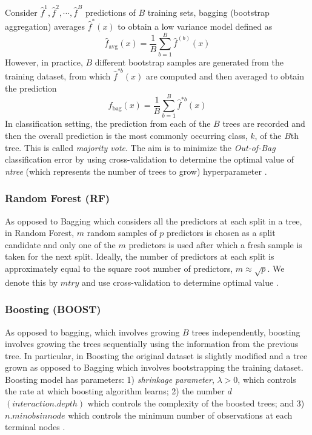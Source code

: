 Consider $\hat{f}^1, \hat{f}^2, \cdots, \hat{f}^B$ predictions of $B$ training sets, bagging (bootstrap aggregation) averages $\hat{f}^*(x)$ to obtain a low variance model defined as
\[
\hat{f}_{\text{avg}}(x) = \frac{1}{B}\sum^{B}_{b=1}{\hat{f}^{(b)}(x)}
\]
However, in practice, $B$ different bootstrap samples are generated from the training dataset, from which $\hat{f}^{*b}(x)$ are computed and then averaged to obtain the prediction 
\[
\hat{f}_{\text{bag}}(x) = \frac{1}{B}\sum^{B}_{b=1}{\hat{f}^{*b}(x)}
\]
In classification setting, the prediction from each of the $B$ trees are recorded and then the overall prediction is the most commonly occurring class, $k$, of the $B$th tree. This is called \textit{majority vote}. The aim is to minimize the \textit{Out-of-Bag} classification error by using cross-validation to determine  the optimal value of \textit{ntree} (which represents the number of trees to grow) hyperparameter \citep{james2013introduction}.

\subsubsection{Random Forest (RF)}

As opposed to Bagging which considers all the predictors at each split in a tree, in Random Forest, $m$ random samples of $p$ predictors is chosen as a split candidate and only one of the $m$ predictors is used after which a fresh sample is taken for the next split. Ideally, the number of predictors at each split is approximately equal to the square root number of predictors, $m\approx\sqrt{p}$. We denote this by $mtry$ and use cross-validation to determine optimal value \citep{james2013introduction}. 

\subsubsection{Boosting (BOOST)}


As opposed to bagging, which involves growing $B$ trees independently, boosting involves growing the trees sequentially using the information from the previous tree. In particular, in Boosting the original dataset is slightly modified and a tree grown as opposed to Bagging which involves bootstrapping the training dataset. Boosting model has parameters: 1) \textit{shrinkage parameter}, $\lambda>0$, which controls the rate at which boosting algorithm learns; 2) the number $d$ $(interaction.depth)$ which controls the complexity of the boosted trees; and 3) $n.minobsinnode$ which controls the minimum number of observations at each terminal nodes \citep{james2013introduction}.

